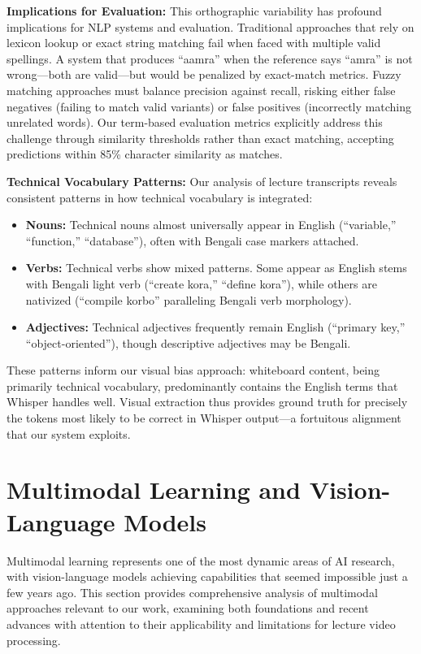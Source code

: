 \textbf{Implications for Evaluation:} This orthographic variability has profound implications for NLP systems and evaluation. Traditional approaches that rely on lexicon lookup or exact string matching fail when faced with multiple valid spellings. A system that produces ``aamra'' when the reference says ``amra'' is not wrong---both are valid---but would be penalized by exact-match metrics. Fuzzy matching approaches must balance precision against recall, risking either false negatives (failing to match valid variants) or false positives (incorrectly matching unrelated words). Our term-based evaluation metrics explicitly address this challenge through similarity thresholds rather than exact matching, accepting predictions within 85\% character similarity as matches.

\textbf{Technical Vocabulary Patterns:} Our analysis of lecture transcripts reveals consistent patterns in how technical vocabulary is integrated:

\begin{itemize}
    \item \textbf{Nouns:} Technical nouns almost universally appear in English (``variable,'' ``function,'' ``database''), often with Bengali case markers attached.
    \item \textbf{Verbs:} Technical verbs show mixed patterns. Some appear as English stems with Bengali light verb (``create kora,'' ``define kora''), while others are nativized (``compile korbo'' paralleling Bengali verb morphology).
    \item \textbf{Adjectives:} Technical adjectives frequently remain English (``primary key,'' ``object-oriented''), though descriptive adjectives may be Bengali.
\end{itemize}

These patterns inform our visual bias approach: whiteboard content, being primarily technical vocabulary, predominantly contains the English terms that Whisper handles well. Visual extraction thus provides ground truth for precisely the tokens most likely to be correct in Whisper output---a fortuitous alignment that our system exploits.

\section{Multimodal Learning and Vision-Language Models}

Multimodal learning represents one of the most dynamic areas of AI research, with vision-language models achieving capabilities that seemed impossible just a few years ago. This section provides comprehensive analysis of multimodal approaches relevant to our work, examining both foundations and recent advances with attention to their applicability and limitations for lecture video processing.

